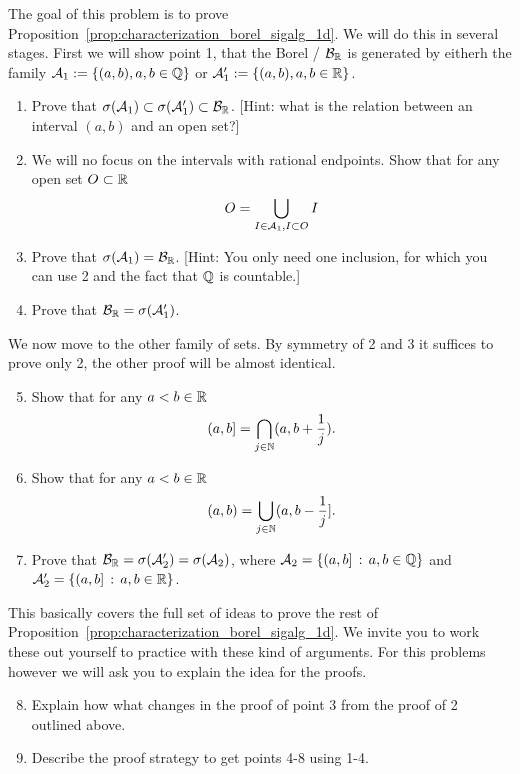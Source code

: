 \begin{problem}[Homework]\label{prb:borel_sigalg_1d}
The goal of this problem is to prove Proposition~\ref{prop:characterization_borel_sigalg_1d}. We will do this in several stages. First we will show point 1, that the Borel \sigalg/ $\mathcal B_{\mathbb R}$ is generated by eitherh the family $\mathcal A_1 := \{(a, b), a,b \in \mathbb Q\}$ or $\mathcal A_1^\prime := \{(a, b), a,b \in \mathbb R\}$.

\begin{enumerate}
\item Prove that $\sigma(\mathcal A_1) \subset \sigma(\mathcal A_1^\prime) \subset \mathcal B_{\mathbb R}$. [Hint: what is the relation between an interval $(a,b)$ and an open set?]
\item We will no focus on the intervals with rational endpoints. Show that for any open set $O \subset \mathbb R$
\[
	O = \bigcup_{I \in \mathcal A_1, I \subset O} I
\]
\item Prove that $\sigma(\mathcal A_1) = \mathcal B_{\mathbb R}$. [Hint: You only need one inclusion, for which you can use 2 and the fact that $\mathbb Q$ is countable.]
\item Prove that $\mathcal B_{\mathbb R} = \sigma(\mathcal A_1^\prime)$.
\end{enumerate}

We now move to the other family of sets. By symmetry of 2 and 3 it suffices to prove only 2, the other proof will be almost identical.
\begin{enumerate}
\setcounter{enumi}{4}
\item Show that for any $a < b \in \mathbb R$
\[
	(a,b] = \bigcap_{j \in \mathbb N} (a, b+\frac{1}{j}).
\]
\item Show that for any $a < b \in \mathbb R$
\[
	(a,b) = \bigcup_{j \in \mathbb N} (a,b-\frac{1}{j}].
\]
\item Prove that $\mathcal B_{\mathbb R} = \sigma(\mathcal A_2^\prime) = \sigma(\mathcal A_2)$, where $\mathcal A_2 = \{(a,b] \, : \, a,b \in \mathbb Q\}$ and $\mathcal A_2^\prime = \{(a,b] \, : \, a,b \in \mathbb R\}$.
\end{enumerate}

This basically covers the full set of ideas to prove the rest of Proposition~\ref{prop:characterization_borel_sigalg_1d}. We invite you to work these out yourself to practice with these kind of arguments. For this problems however we will ask you to explain the idea for the proofs.
\begin{enumerate}
\setcounter{enumi}{7}
\item Explain how what changes in the proof of point 3 from the proof of 2 outlined above.
\item Describe the proof strategy to get points 4-8 using 1-4.
\end{enumerate}
\end{problem}

